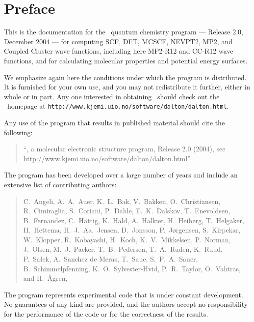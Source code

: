 \tableofcontents

\chapter*{Preface}

This is the documentation for the \dalton\ quantum chemistry program
--- Release 2.0, December 2004 --- for computing SCF, DFT, 
MCSCF, NEVPT2,  MP2, and Coupled Cluster wave functions, including here MP2-R12 and CC-R12 wave functions, and for calculating 
molecular properties and potential energy surfaces.

          We emphasize again here the conditions under which the
program is distributed.  It is furnished for your own use,
and you may not redistribute it further, either in whole or in
part.  Any one interested in obtaining \dalton\ should check out the
\dalton\ homepage at
\verb|http://www.kjemi.uio.no/software/dalton/dalton.html|.

Any use of the program that results in published
material should cite the following:
\begin{quote}
``\dalton , a molecular electronic  structure program, Release
2.0 (2004), see http://www.kjemi.uio.no/software/dalton/dalton.html''
\end{quote}

The program has been developed over a large number of years and
include an extensive list of contributing authors:

\begin{quote}
C.~Angeli,
A.~A.~Auer,
K.~L.~Bak,
V.~Bakken,
O.~Christiansen,
R.~Cimiraglia,
S.~Coriani,
P.~Dahle,
E.~K.~Dalskov,
T.~Enevoldsen,
B.~Fernandez,
C.~H{\"a}ttig,
K.~Hald,
A.~Halkier,
H.~Heiberg,
T.~Helgaker,
H.~Hettema,
H.~J.~Aa.~Jensen,
D.~Jonsson,
P.~J{\o}rgensen,
S.~Kirpekar,
W.~Klopper,
R.~Kobayashi,
H.~Koch,
K.~V.~Mikkelsen,
P.~Norman,
J.~Olsen,
M.~J.~Packer,
T.~B.~Pedersen,
T.~A.~Ruden,
K.~Ruud,
P.~Sa\l ek,
A.~Sanchez de Meras,
T.~Saue,
S.~P.~A.~Sauer,
B.~Schimmelpfenning,
K.~O.~Sylvester-Hvid,
P.~R.~Taylor,
O.~Vahtras,
and H.~{\AA}gren,
\end{quote}

          The program represents experimental code that is
under constant development.  No guarantees of any kind are
provided, and the authors accept no responsibility for the
performance of the code or for the correctness of the results.
